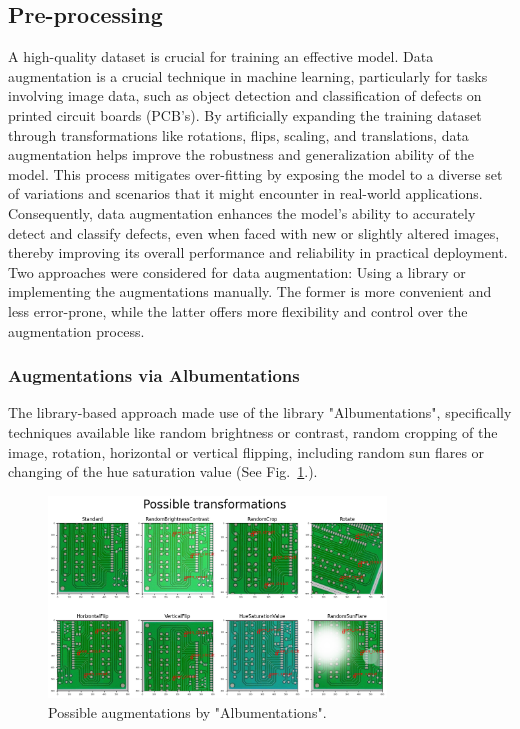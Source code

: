 \documentclass[12pt]{article}
\begin{document}
\subsection{Pre-processing}
A high-quality dataset is crucial for training an effective model. Data augmentation is a crucial technique in machine learning, 
particularly for tasks involving image data, such as object detection and classification of defects on printed circuit boards (PCB's). 
By artificially expanding the training dataset through transformations like rotations, flips, scaling, and translations, data augmentation 
helps improve the robustness and generalization ability of the model. This process mitigates over-fitting by exposing the model to a diverse 
set of variations and scenarios that it might encounter in real-world applications. Consequently, data augmentation enhances the model's 
ability to accurately detect and classify defects, even when faced with new or slightly altered images, thereby improving its overall 
performance and reliability in practical deployment.
Two approaches were considered for data augmentation: Using a library or implementing the augmentations manually. The former is more convenient and less error-prone, while the latter offers more flexibility and control over the augmentation process. 

\subsubsection{Augmentations via Albumentations}

The library-based approach made use of the library "Albumentations", specifically techniques available like random brightness or contrast, random cropping of the image, rotation, horizontal or vertical flipping, including random sun flares or changing of the hue saturation value (See Fig.~\ref{fig:Albumentations}.).

\begin{figure}[h]
    \centering
    \includegraphics[width=0.8\textwidth]{./graphics/5.png}
    \caption{Possible augmentations by "Albumentations".}
    \label{fig:Albumentations}
\end{figure}
\end{document}
